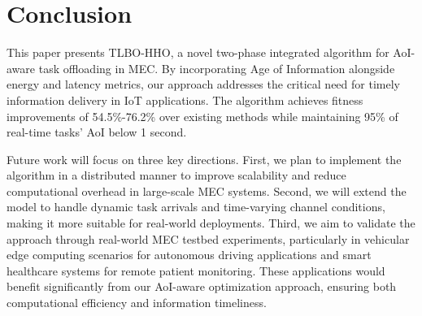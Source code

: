 \documentclass[conference]{IEEEtran}
\begin{document}
\section{Conclusion}

This paper presents TLBO-HHO, a novel two-phase integrated algorithm for AoI-aware task offloading in MEC. By incorporating Age of Information alongside energy and latency metrics, our approach addresses the critical need for timely information delivery in IoT applications. The algorithm achieves fitness improvements of 54.5\%-76.2\% over existing methods while maintaining 95\% of real-time tasks' AoI below 1 second. 

Future work will focus on three key directions. First, we plan to implement the algorithm in a distributed manner to improve scalability and reduce computational overhead in large-scale MEC systems. Second, we will extend the model to handle dynamic task arrivals and time-varying channel conditions, making it more suitable for real-world deployments. Third, we aim to validate the approach through real-world MEC testbed experiments, particularly in vehicular edge computing scenarios for autonomous driving applications and smart healthcare systems for remote patient monitoring. These applications would benefit significantly from our AoI-aware optimization approach, ensuring both computational efficiency and information timeliness.


 
\end{document}
